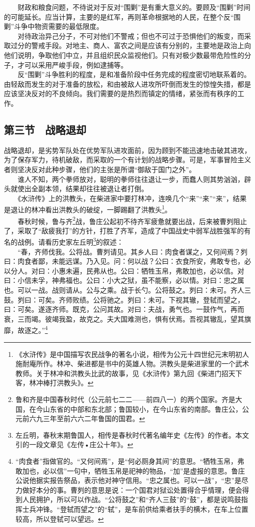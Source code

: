 \documentclass[cn,11pt,chinese]{elegantbook}
\def\myformat#1{\hfil\hfil #1}
\begin{document}
　　财政和粮食问题，不待说对于反对“围剿”是有重大意义的。要顾及“围剿”时间的可能延长。应当计算，主要的是红军，再则革命根据地的人民，在整个反“围剿”斗争中物资需要的最低限度。\\
　　对待政治异己分子，不可对他们不警戒；但也不可过于恐惧他们的叛变，而采取过分的警戒手段。对地主、商人、富农之间是应该有分别的，主要地是政治上向他们说明，争取他们中立，并且组织民众监视他们。只有对极少数最带危险性的分子，才可以采用严峻手段，例如逮捕等。\\
　　反“围剿”斗争胜利的程度，是和准备阶段中任务完成的程度密切地联系着的。由轻敌而发生的对于准备的放松，和由被敌人进攻所吓倒而发生的惊惶失措，都是应该坚决反对的不良倾向。我们需要的是热烈而镇定的情绪，紧张而有秩序的工作。\\
\subsection*{\myformat{第三节　战略退却}}
战略退却，是劣势军队处在优势军队进攻面前，因为顾到不能迅速地击破其进攻，为了保存军力，待机破敌，而采取的一个有计划的战略步骤。可是，军事冒险主义者则坚决反对此种步骤，他们的主张是所谓“御敌于国门之外”。\\
　　谁人不知，两个拳师放对，聪明的拳师往往退让一步，而蠢人则其势汹汹，辟头就使出全副本领，结果却往往被退让者打倒。\\
　　《水浒传》上的洪教头，在柴进家中要打林冲，连唤几个“来”“来”“来”，结果是退让的林冲看出洪教头的破绽，一脚踢翻了洪教头\footnote[27]{ 《水浒传》是中国描写农民战争的著名小说，相传为公元十四世纪元末明初人施耐庵所作。林冲、柴进都是书中的英雄人物。洪教头是柴进家里的一个武术教师。关于林冲和洪教头比武的故事，见《水浒传》第九回《柴进门招天下客，林冲棒打洪教头》。}。\\
　　春秋时候，鲁与齐\footnote[28]{ 鲁和齐是中国春秋时代（公元前七二二——前四八一）的两个国家。齐是大国，在今山东省的中部和东北部；鲁国较小，在今山东省的南部。鲁庄公，公元前六九三年至前六六二年鲁国的国君。}战，鲁庄公起初不待齐军疲惫就要出战，后来被曹刿阻止了，采取了“敌疲我打”的方针，打胜了齐军，造成了中国战史中弱军战胜强军的有名的战例。请看历史家左丘明\footnote[29]{ 左丘明，春秋末期鲁国人，相传是春秋时代著名编年史《左传》的作者。本文引的一段文章见《左传•庄公十年》。}的叙述：\\
　　“春，齐师伐我。公将战。曹刿请见。其乡人曰：肉食者谋之，又何间焉？刿曰：肉食者鄙，未能远谋。乃入见。问：何以战？公曰：衣食所安，弗敢专也，必以分人。对曰：小惠未遍，民弗从也。公曰：牺牲玉帛，弗敢加也，必以信。对曰：小信未孚，神弗福也。公曰：小大之狱，虽不能察，必以情。对曰：忠之属也。可以一战。战则请从。公与之乘。战于长勺。公将鼓之。刿曰：未可。齐人三鼓。刿曰：可矣。齐师败绩。公将驰之。刿曰：未可。下视其辙，登轼而望之，曰：可矣。遂逐齐师。既克，公问其故。对曰：夫战，勇气也。一鼓作气，再而衰，三而竭。彼竭我盈，故克之。夫大国难测也，惧有伏焉。吾视其辙乱，望其旗靡，故逐之。”\footnote[30]{ “肉食者”指做官的。“又何间焉”，是“何必厕身其间”的意思。“牺牲玉帛，弗敢加也，必以信”一句中，牺牲玉帛是祀神的物品，“加”是虚报的意思。鲁庄公说他据实报告祭品，表示他对神守信用。“忠之属也。可以一战”，“忠”是尽力做好本分的事。曹刿的意思是说：一个国君对狱讼处置得合乎情理，便会得到人民拥护，所以可以作战。“公将鼓之”和“齐人三鼓”的“鼓”，都是说鸣鼓指挥士兵冲锋。“登轼而望之”的“轼”，是车前供给乘者扶手的横木，在车上位置较高，所以登轼可以望远。}\\
\end{document}
